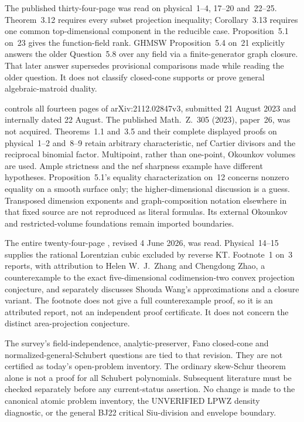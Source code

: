 The published thirty-four-page
\cite{CastilloCidRuizLiMontanoZhang20MultidegreesPublished}
was read on physical~1--4, 17--20 and~22--25. Theorem~3.12
requires every subset projection inequality; Corollary~3.13
requires one common top-dimensional component in the reducible
case. Proposition~5.1 on~23 gives the function-field rank.
GHMSW Proposition~5.4 on~21 explicitly answers the older
Question~5.8 over any field via a finite-generator graph closure.
That later answer supersedes provisional comparisons made while
reading the older question. It does not classify closed-cone
supports or prove general algebraic-matroid duality.

\cite{JiangLi23ReverseKTV3} controls all fourteen pages of
arXiv:2112.02847v3, submitted 21 August 2023 and internally
dated 22 August. The published Math.~Z.~305 (2023), paper~26,
was not acquired. Theorems~1.1 and~3.5 and their complete
displayed proofs on physical~1--2 and~8--9 retain arbitrary
characteristic, nef Cartier divisors and the reciprocal binomial
factor. Multipoint, rather than one-point, Okounkov volumes
are used. Ample strictness and the nef sharpness example have
different hypotheses. Proposition~5.1's equality characterization
on~12 concerns nonzero equality on a smooth surface only;
the higher-dimensional discussion is a guess. Transposed
dimension exponents and graph-composition notation elsewhere
in that fixed source are not reproduced as literal formulas.
Its external Okounkov and restricted-volume foundations remain
imported boundaries.

The entire twenty-four-page \cite{Huh26VolumeSurveyV4}, revised
4 June 2026, was read. Physical~14--15 supplies the rational
Lorentzian cubic excluded by reverse KT. Footnote~1 on~3
reports, with attribution to Helen W.~J.~Zhang and Chengdong
Zhao, a counterexample to the exact five-dimensional
codimension-two convex projection conjecture, and separately
discusses Shouda Wang's approximations and a closure variant.
The footnote does not give a full counterexample proof, so it
is an attributed report, not an independent proof certificate.
It does not concern the distinct area-projection conjecture.

The survey's field-independence, analytic-preserver, Fano
closed-cone and normalized-general-Schubert questions are tied
to that revision. They are not certified as today's open-problem
inventory. The ordinary skew-Schur theorem alone is not a proof
for all Schubert polynomials. Subsequent literature must be
checked separately before any current-status assertion.
No change is made to the canonical atomic problem inventory,
the UNVERIFIED LPWZ density diagnostic, or the general BJ22
critical Siu-division and envelope boundary.

